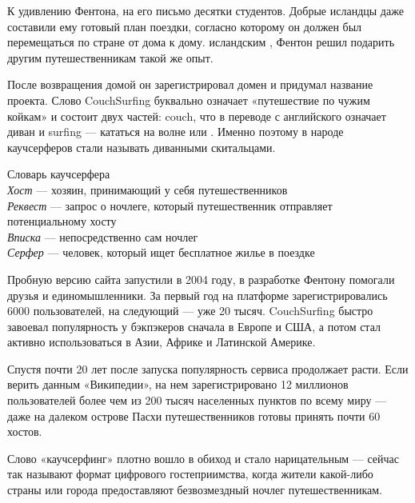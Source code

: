 К удивлению Фентона, на его письмо  десятки студентов. Добрые исландцы даже составили ему готовый план поездки, согласно которому он должен был перемещаться по стране от дома к дому.  исландским , Фентон решил подарить другим путешественникам такой же опыт.

После возвращения домой он зарегистрировал домен и придумал название проекта. Слово CouchSurfing буквально означает «путешествие по чужим койкам» и состоит двух частей: couch, что в переводе с английского означает диван и surfing — кататься на волне или . Именно поэтому в народе каучсерферов стали называть диванными скитальцами.

\begin{fancyquotes}
    Словарь каучсерфера\\

    \textit{Хост} — хозяин, принимающий у себя путешественников\\

    \textit{Реквест} — запрос о ночлеге, который путешественник отправляет потенциальному хосту\\

    \textit{Вписка} — непосредственно сам ночлег\\

    \textit{Серфер} — человек, который ищет бесплатное жилье в поездке
\end{fancyquotes}

Пробную версию сайта запустили в 2004 году, в разработке Фентону помогали друзья и единомышленники. За первый год на платформе зарегистрировались 6000 пользователей, на следующий — уже 20 тысяч. CouchSurfing быстро завоевал популярность у бэкпэкеров сначала в Европе и США, а потом стал активно использоваться в Азии, Африке и Латинской Америке.

Спустя почти 20 лет после запуска популярность сервиса продолжает расти. Если верить данным «Википедии», на нем зарегистрировано 12 миллионов пользователей более чем из 200 тысяч населенных пунктов по всему миру — даже на далеком острове Пасхи путешественников готовы принять почти 60 хостов.

Слово «каучсерфинг» плотно вошло в обиход и стало нарицательным — сейчас так называют формат цифрового гостеприимства, когда жители какой-либо страны или города предоставляют безвозмездный ночлег путешественникам.

